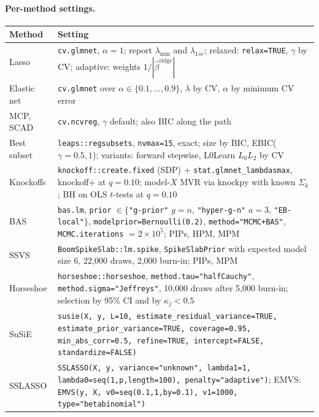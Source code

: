 \documentclass[11pt,letterpaper]{article}
\newcommand{\code}[1]{\texttt{#1}}
\newcommand{\pkg}[1]{\textsf{#1}}
\begin{document}
\paragraph{Per-method settings.}
\begin{center}\small
\begin{tabular}{@{}lp{10.8cm}@{}}
\toprule
Method & Setting \\
\midrule
Lasso & \code{cv.glmnet}, $\alpha=1$; report $\lambda_{\min}$ and $\lambda_{1se}$; relaxed: \code{relax=TRUE}, $\gamma$ by CV; adaptive: weights $1/|\hat\beta^{\mathrm{ridge}}|$ \\
Elastic net & \code{cv.glmnet} over $\alpha\in\{0.1,\dots,0.9\}$, $\lambda$ by CV, $\alpha$ by minimum CV error \\
MCP, SCAD & \code{cv.ncvreg}, $\gamma$ default; also BIC along the path \\
Best subset & \code{leaps::regsubsets}, \code{nvmax=15}, exact; size by BIC, EBIC($\gamma=0.5,1$); variants: forward stepwise, \pkg{L0Learn} $L_0L_2$ by CV \\
Knockoffs & \code{knockoff::create.fixed} (SDP) + \code{stat.glmnet\_lambdasmax}, knockoff+ at $q=0.10$; model-$X$ MVR via \pkg{knockpy} with known $\Sigma_k$; BH on OLS $t$-tests at $q=0.10$ \\
BAS & \code{bas.lm}, \code{prior} $\in\{$\code{"g-prior"} $g=n$, \code{"hyper-g-n"} $a=3$, \code{"EB-local"}$\}$, \code{modelprior=Bernoulli(0.2)}, \code{method="MCMC+BAS"}, \code{MCMC.iterations} $=2\times10^5$; PIPs, HPM, MPM \\
SSVS & \code{BoomSpikeSlab::lm.spike}, \code{SpikeSlabPrior} with expected model size 6, 22{,}000 draws, 2{,}000 burn-in; PIPs, MPM \\
Horseshoe & \code{horseshoe::horseshoe}, \code{method.tau="halfCauchy"}, \code{method.sigma="Jeffreys"}, 10{,}000 draws after 5{,}000 burn-in; selection by 95\% CI and by $\kappa_j<0.5$ \\
SuSiE & \code{susie(X, y, L=10, estimate\_residual\_variance=TRUE, estimate\_prior\_variance=TRUE, coverage=0.95, min\_abs\_corr=0.5, refine=TRUE, intercept=FALSE, standardize=FALSE)} \\
SSLASSO & \code{SSLASSO(X, y, variance="unknown", lambda1=1, lambda0=seq(1,p,length=100), penalty="adaptive")}; EMVS: \code{EMVS(y, X, v0=seq(0.1,1,by=0.1), v1=1000, type="betabinomial")} \\
\bottomrule
\end{tabular}
\end{center}
\end{document}

